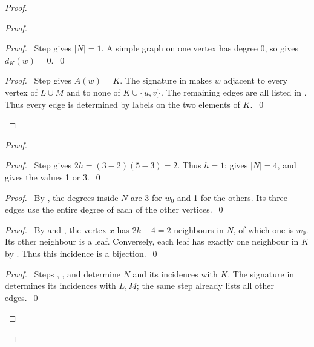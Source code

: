 \begin{proof}
 \begin{proof}
  \begin{proof}
   \pf\ Step  gives $|N|=1$.
   A simple graph on one vertex has degree 0, so  gives $d_K(w)=0$.~\qed
  \end{proof}
  \qedstep
  \begin{proof}
   \pf\ Step  gives $A(w)=K$.
   The signature in  makes $w$ adjacent to every vertex of $L\cup M$
   and to none of $K\cup\{u,v\}$. The remaining edges are all listed in
   . Thus every edge is determined by labels on the two elements of $K$.~\qed
  \end{proof}
 \end{proof}

 \begin{proof}
  \begin{proof}
   \pf\ Step  gives $2h=(3-2)(5-3)=2$.
   Thus $h=1$;  gives $|N|=4$, and 
   gives the values 1 or 3.~\qed
  \end{proof}
  \begin{proof}
   \pf\ By , the degrees inside $N$ are 3 for $w_0$ and 1 for
   the others. Its three edges use the entire degree of each of the other vertices.~\qed
  \end{proof}
  \begin{proof}
   \pf\ By  and , the vertex $x$ has
   $2k-4=2$ neighbours in $N$, of which one is $w_0$.
   Its other neighbour is a leaf. Conversely, each leaf has exactly one neighbour in $K$
   by . Thus this incidence is a bijection.~\qed
  \end{proof}
  \qedstep
  \begin{proof}
   \pf\ Steps , , and 
   determine $N$ and its incidences with $K$.
   The signature in  determines its incidences with $L,M$;
   the same step already lists all other edges.~\qed
  \end{proof}
 \end{proof}


\end{proof}
